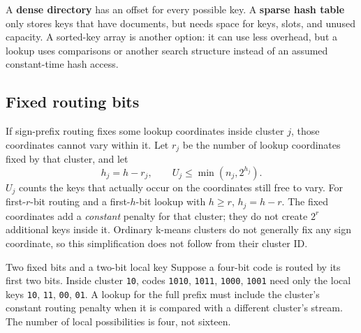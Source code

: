 A \textbf{dense directory} has an offset for every possible key. A \textbf{sparse hash table}
only stores keys that have documents, but needs space for keys, slots, and unused capacity. A sorted-key array is
another option: it can use less overhead, but a lookup uses comparisons or another search
structure instead of an assumed constant-time hash access.

\subsection{Fixed routing bits}
If sign-prefix routing fixes some lookup coordinates inside cluster $j$, those coordinates
cannot vary within it. Let $r_j$ be the number of lookup coordinates fixed by that cluster,
and let
\begin{equation}
h_j=h-r_j,\qquad U_j\leq\min(n_j,2^{h_j}).
\label{eq:free-key}
\end{equation}
$U_j$ counts the keys that actually occur on the coordinates still free to vary. For first-$r$-bit routing and a first-$h$-bit lookup
with $h\geq r$, $h_j=h-r$. The fixed coordinates add a \emph{constant} penalty for that cluster;
they do not create $2^r$ additional keys inside it. Ordinary k-means clusters do not generally
fix any sign coordinate, so this simplification does not follow from their cluster ID.

\begin{examplebox}{Two fixed bits and a two-bit local key}
Suppose a four-bit code is routed by its first two bits. Inside cluster \texttt{10}, codes
\texttt{1010}, \texttt{1011}, \texttt{1000}, \texttt{1001} need only the local keys
\texttt{10}, \texttt{11}, \texttt{00}, \texttt{01}. A lookup for the full prefix must include
the cluster's constant routing penalty when it is compared with a different cluster's stream.
The number of local possibilities is four, not sixteen.
\end{examplebox}

